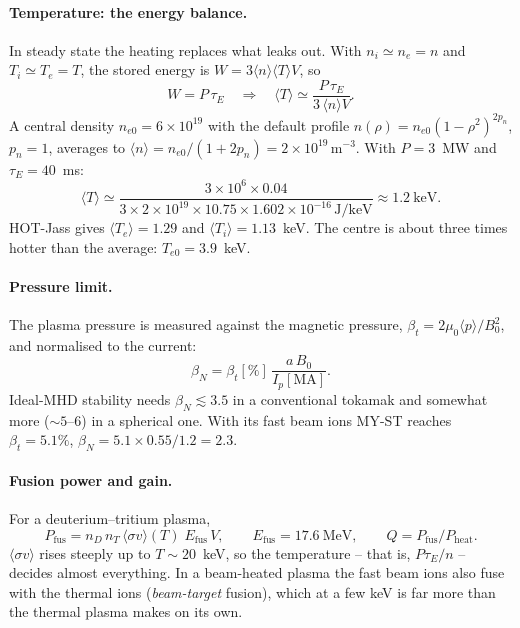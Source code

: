 \documentclass[11pt,a4paper]{article}
\begin{document}
\paragraph{Temperature: the energy balance.}
In steady state the heating replaces what leaks out. With
$n_i\simeq n_e = n$ and $T_i \simeq T_e = T$, the stored energy is
$W = 3\langle n\rangle\langle T\rangle V$, so
\[
  W = P\,\tau_E \quad\Longrightarrow\quad
  \langle T\rangle \simeq \frac{P\,\tau_E}{3\,\langle n\rangle V}.
\]
A central density $n_{e0}=6\times10^{19}$ with the default profile
$n(\rho)=n_{e0}(1-\rho^2)^{2p_n}$, $p_n=1$, averages to
$\langle n\rangle = n_{e0}/(1+2p_n) = 2\times10^{19}\,\mathrm{m^{-3}}$. With
$P=3$~MW and $\tau_E=40$~ms:
\[
  \langle T\rangle \simeq \frac{3\times10^{6}\times0.04}
  {3\times2\times10^{19}\times10.75\times1.602\times10^{-16}\,\mathrm{J/keV}}
  \approx 1.2~\mathrm{keV}.
\]
HOT-Jass gives $\langle T_e\rangle = 1.29$ and $\langle T_i\rangle = 1.13$~keV.
The centre is about three times hotter than the average: $T_{e0}=3.9$~keV.

\paragraph{Pressure limit.}
The plasma pressure is measured against the magnetic pressure,
$\beta_t = 2\mu_0\langle p\rangle/B_0^2$, and normalised to the current:
\[
  \beta_N = \beta_t[\%]\,\frac{a\,B_0}{I_p[\mathrm{MA}]} .
\]
Ideal-MHD stability needs $\beta_N\lesssim 3.5$ in a conventional tokamak and
somewhat more ($\sim5$--6) in a spherical one. With its fast beam ions MY-ST
reaches $\beta_t=5.1\%$, $\beta_N = 5.1\times0.55/1.2 = 2.3$.

\paragraph{Fusion power and gain.}
For a deuterium--tritium plasma,
\[
  P_{\mathrm{fus}} = n_D\, n_T\, \langle\sigma v\rangle(T)\; E_{\mathrm{fus}}\, V,
  \qquad E_{\mathrm{fus}} = 17.6~\mathrm{MeV},
  \qquad Q = P_{\mathrm{fus}}/P_{\mathrm{heat}} .
\]
$\langle\sigma v\rangle$ rises steeply up to $T\sim 20$~keV, so the temperature
-- that is, $P\tau_E/n$ -- decides almost everything. In a beam-heated plasma
the fast beam ions also fuse with the thermal ions (\emph{beam-target}
fusion), which at a few keV is far more than the thermal plasma makes on its own.
\end{document}

